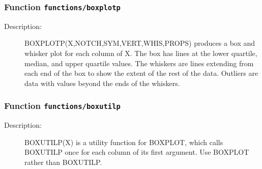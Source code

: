 \subsubsection[Function \texttt{boxplotp}]{Function \texttt{functions/boxplotp}}%
%
\label{ref_functions__boxplotp}%
\hypertarget{ref_functions__boxplotp}{}%
\begin{description}
%
%
\item[Description:]%
BOXPLOTP(X,NOTCH,SYM,VERT,WHIS,PROPS) produces a box and whisker plot for
   each column of X. The box has lines at the lower quartile, median, 
   and upper quartile values. The whiskers are lines extending from 
   each end of the box to show the extent of the rest of the data. 
   Outliers are data with values beyond the ends of the whiskers.
%
%
%
%
%
\end{description}
\methodline%
\subsubsection[Function \texttt{boxutilp}]{Function \texttt{functions/boxutilp}}%
%
\label{ref_functions__boxutilp}%
\hypertarget{ref_functions__boxutilp}{}%
\begin{description}
%
%
\item[Description:]%
BOXUTILP(X) is a utility function for BOXPLOT, which calls
   BOXUTILP once for each column of its first argument. Use
   BOXPLOT rather than BOXUTILP. 
%
%
%
%
%
\end{description}
\methodline%
